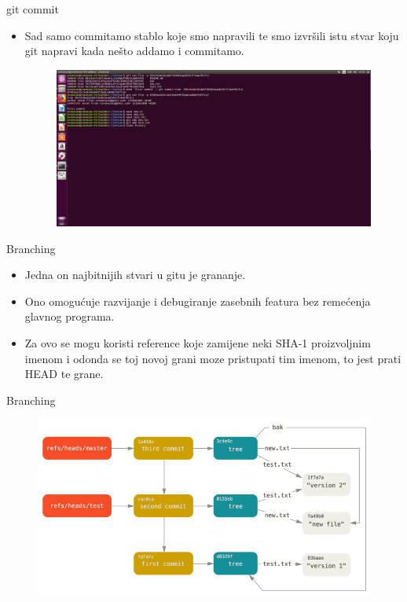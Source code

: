 \documentclass{beamer}
\begin{document}
\begin{frame}{git commit}

\begin{itemize}
	\item Sad samo commitamo stablo koje smo napravili te smo izvršili istu stvar koju git napravi kada nešto addamo i commitamo.
	\begin{figure}
		\centering
	\includegraphics[width=.8\textwidth]{./slike/sedma_slika.png}
	\end{figure}
\end{itemize}
\end{frame}
\begin{frame}{Branching}
	\begin{itemize}
	\item Jedna on najbitnijih stvari u gitu je grananje.
	\item Ono omogućuje razvijanje i debugiranje zasebnih featura bez remećenja glavnog programa. 
	\item Za ovo se mogu koristi reference koje zamijene neki SHA-1 proizvoljnim imenom i odonda se toj novoj grani moze pristupati tim imenom, to jest prati HEAD te grane.
	\end{itemize}
	
\end{frame}
\begin{frame}{Branching}
\begin{figure}
		\centering
	\includegraphics[width=1\textwidth]{./slike/a.png}
	\end{figure}
\end{frame}
\end{document}
